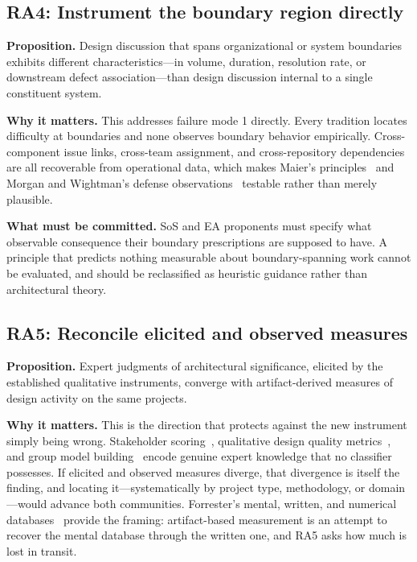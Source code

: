 \documentclass[11pt,a4paper]{article}
\begin{document}
\subsection{RA4: Instrument the boundary region directly}

\textbf{Proposition.} Design discussion that spans organizational or system
boundaries exhibits different characteristics---in volume, duration, resolution
rate, or downstream defect association---than design discussion internal to a
single constituent system.

\textbf{Why it matters.} This addresses failure mode 1 directly. Every tradition
locates difficulty at boundaries and none observes boundary behavior
empirically. Cross-component issue links, cross-team assignment, and
cross-repository dependencies are all recoverable from operational data, which
makes Maier's principles~\citep{maier1998} and Morgan and Wightman's defense
observations~\citep{morgan2023} testable rather than merely plausible.

\textbf{What must be committed.} SoS and EA proponents must specify what
observable consequence their boundary prescriptions are supposed to have. A
principle that predicts nothing measurable about boundary-spanning work cannot
be evaluated, and should be reclassified as heuristic guidance rather than
architectural theory.

\subsection{RA5: Reconcile elicited and observed measures}

\textbf{Proposition.} Expert judgments of architectural significance, elicited by
the established qualitative instruments, converge with artifact-derived measures
of design activity on the same projects.

\textbf{Why it matters.} This is the direction that protects against the new
instrument simply being wrong. Stakeholder scoring~\citep{moore2003},
qualitative design quality metrics~\citep{nord2014}, and group model
building~\citep{hovmand2013} encode genuine expert knowledge that no classifier
possesses. If elicited and observed measures diverge, that divergence is itself
the finding, and locating it---systematically by project type, methodology, or
domain---would advance both communities. Forrester's mental, written, and
numerical databases~\citep{forrester2009} provide the framing: artifact-based
measurement is an attempt to recover the mental database through the written
one, and RA5 asks how much is lost in transit.
\end{document}
